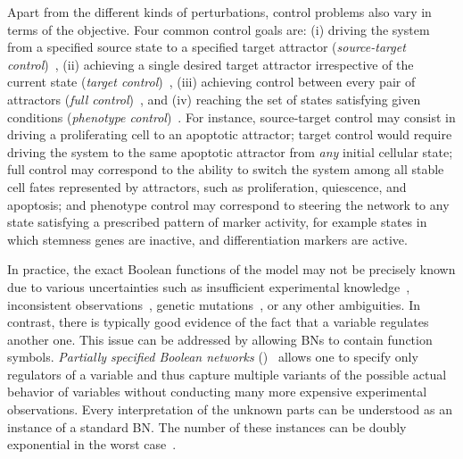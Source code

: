 Apart from the different kinds of perturbations, control problems also vary in terms of the objective. Four common control goals are: (i) driving the system from a specified source state to a specified target attractor (\emph{source-target control})~\cite{Su2019CMSB}, (ii) achieving a single desired target attractor irrespective of the current state (\emph{target control})~\cite{Kim2013}, (iii) achieving control between every pair of attractors (\emph{full control})~\cite{Fiedler2013}, and (iv) reaching the set of states satisfying given conditions (\emph{phenotype control})~\cite{Fontanals2020}. For instance, source-target control may consist in driving a proliferating cell to an apoptotic attractor; target control would require driving the system to the same apoptotic attractor from \emph{any} initial cellular state; full control may correspond to the ability to switch the system among all stable cell fates represented by attractors, such as proliferation, quiescence, and apoptosis; and phenotype control may correspond to steering the network to any state satisfying a prescribed pattern of marker activity, for example states in which stemness genes are inactive, and differentiation markers are active.

In practice, the exact Boolean functions of the model may not be precisely known due to various uncertainties such as insufficient experimental knowledge~\cite{Grieco2013}, inconsistent observations~\cite{Geris2016}, genetic mutations~\cite{Martin2016}, or any other ambiguities. In contrast, there is typically good evidence of the fact that a variable regulates another one. This issue can be addressed by allowing BNs to contain function symbols. \emph{Partially specified Boolean networks} ()~\cite{Zou2013, Benes2019} allows one to specify only regulators of a variable and thus capture multiple variants of the possible actual behavior of variables without conducting many more expensive experimental observations. Every interpretation of the unknown parts can be understood as an instance of a standard BN. The number of these instances can be doubly exponential in the worst case~\cite{Wang2012}. 

